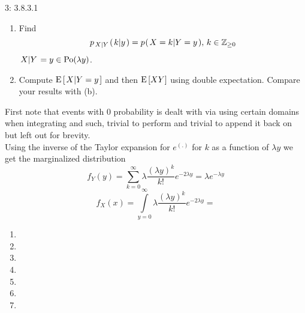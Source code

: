 \documentclass[a4paper,twoside=false,abstract=false,numbers=noenddot,
titlepage=false,headings=small,parskip=half,version=last]{scrartcl}
\begin{document}
\begin{exercise}{3: 3.8.3.1}
\begin{enumerate}
        \item Find
            \begin{equation}
                p_{\left. X \middle\vert Y \right.} (\left. k \middle\vert y \right.) =
                p_{} (\left. X=k \middle\vert Y=y \right.), \, k\in\mathbb{Z}_{\ge 0}
            \end{equation}
            \Answer $\left. X \middle\vert Y \right. = y\in\text{Po}(\lambda y)$.

        \item Compute ${\rm E}\,[\left. X \middle\vert Y=y \right.]$ and then
            ${\rm E}\,[XY]$ using double expectation.
            Compare your results with (b).

    \end{enumerate}
\end{exercise}
\begin{solution}
    First note that events with $0$ probability is dealt with via using certain domains
    when integrating and such, trivial to perform and trivial to append it back on but left out for
    brevity.\\
    Using the inverse of the Taylor expansion for $e^{(.)}$ for $k$ as a
    function of $\lambda y$ we get the marginalized distribution
    \begin{equation}
        \label{eq:firstsum}
        f_Y(y) = \sum\limits_{k=0}^\infty
            \lambda \frac{(\lambda y)^k}{k!}e^{-2\lambda y} =
            \lambda e^{-\lambda y}
    \end{equation}
    \begin{equation}
        f_X(x) = \int\limits_{y=0}^\infty
            \lambda \frac{(\lambda y)^k}{k!}e^{-2\lambda y} =
    \end{equation}
    \begin{enumerate}
        \item
        \item
        \item
        \item
        \item
        \item
        \item
    \end{enumerate}
\end{solution}
\pagebreak
\end{document}
